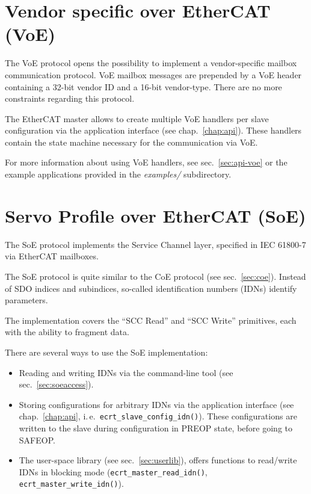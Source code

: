 \documentclass[a4paper,12pt,BCOR6mm,bibtotoc,idxtotoc]{scrbook}
\begin{document}
\section{Vendor specific over EtherCAT (VoE)}
\label{sec:voe}

The VoE protocol opens the possibility to implement a vendor-specific mailbox
communication protocol. VoE mailbox messages are prepended by a VoE header
containing a 32-bit vendor ID and a 16-bit vendor-type. There are no more
constraints regarding this protocol.

The EtherCAT master allows to create multiple VoE handlers per slave
configuration via the application interface (see chap.~\ref{chap:api}). These
handlers contain the state machine necessary for the communication via VoE.

For more information about using VoE handlers, see sec.~\ref{sec:api-voe} or
the example applications provided in the \textit{examples/} subdirectory.


\section{Servo Profile over EtherCAT (SoE)}
\label{sec:soe}

The SoE protocol implements the Service Channel layer, specified in IEC
61800-7 \cite{soespec} via EtherCAT mailboxes.

The SoE protocol is quite similar to the CoE protocol (see
sec.~\ref{sec:coe}). Instead of SDO indices and subindices, so-called
identification numbers (IDNs) identify parameters.

The implementation covers the ``SCC Read'' and ``SCC Write'' primitives, each
with the ability to fragment data.

There are several ways to use the SoE implementation:

\begin{itemize}

\item Reading and writing IDNs via the command-line tool (see
sec.~\ref{sec:soeaccess}).

\item Storing configurations for arbitrary IDNs via the application interface
(see chap.~\ref{chap:api}, i.\,e.~\lstinline+ecrt_slave_config_idn()+). These
configurations are written to the slave during configuration in PREOP state,
before going to SAFEOP.

\item The user-space library (see sec.~\ref{sec:userlib}), offers functions to
read/write IDNs in blocking mode (\lstinline+ecrt_master_read_idn()+,
\lstinline+ecrt_master_write_idn()+).

\end{itemize}
\end{document}

